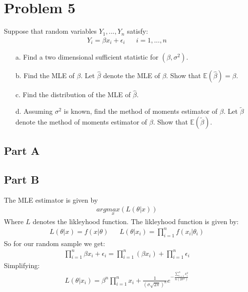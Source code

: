 \documentclass{article}
\begin{document}
\section*{Problem 5}
Suppose that random variables $Y_1,...,Y_n$ satisfy:
\begin{align*}
Y_i = \beta x_i + \epsilon_i && i=1,...,n
\end{align*}
\begin{enumerate}
\item[a.] Find a two dimensional sufficient statistic for $(\beta,\sigma^2)$. 
\item[b.] Find the MLE of $\beta$. Let $\hat{\beta}$ denote the MLE of $\beta$. Show that $\mathbb{E}(\hat{\beta})=\beta$.
\item[c.] Find the distribution of the MLE of $\hat{\beta}$.
\item[d.] Assuming $\sigma^2$ is known, find the method of moments estimator of $\beta$. Let $\tilde{\beta}$ denote the method of moments estimator of $\beta$. Show that $\mathbb{E}(\tilde{\beta})$.
\end{enumerate}
\subsection*{Part A}
\subsection*{Part B}
The MLE estimator is given by
\begin{align*}
arg \underset{x}{max} (L(\theta|x))
\end{align*}
Where $L$ denotes the likleyhood function. The likleyhood function is given by:
\begin{align*}
L(\theta|x) = f(x|\theta) && L(\theta|x_i) = \prod_{i=1}^{n} f(x_i|\theta_i)
\end{align*}
So for our random sample we get:
\begin{align*}
\prod_{i=1}^{n} \beta x_i + \epsilon_i  = \prod_{i=1}^{n} (\beta x_i) + \prod_{i=1}^{n} \epsilon_i
\end{align*}
Simplifying:
\begin{align*}
L(\theta|x_i)  = \beta^n \prod_{i=1}^{n} x_i + \frac{1}{(\sigma \sqrt{2\pi})^n} e^{-\tfrac{\sum_{i=1}^{n} x_i^2}{n (2\sigma^2)}}
\end{align*}

\clearpage
\end{document}
